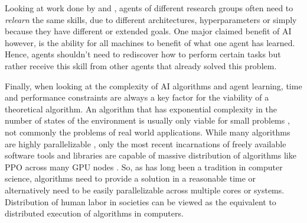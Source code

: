 \documentclass[12pt,a4paper]{article}
\begin{document}


Looking at work done by \cite{bansal2017emergent} and \cite{proximalpolicyopt}, agents of different research groups
often need to \emph{relearn} the same skills, due to different architectures, hyperparameters or simply because they
have different or extended goals. One major claimed benefit of \ac{AI} however, is the ability for all machines to
benefit of what one agent has learned. Hence, agents shouldn't need to rediscover how to perform certain tasks but
rather receive this skill from other agents that already solved this problem.

Finally, when looking at the complexity of AI algorithms and agent learning, time and performance constraints are always
a key factor for the viability of a theoretical algorithm. An algorithm that has exponential complexity in the number of
states of the environment is usually only viable for small problems \cite[p.839f.]{russell2016artificial}, not commonly
the problems of real world applications. While many algorithms are highly parallelizable
\cite{tensorflow2015-whitepaper}, only the most recent incarnations of freely available software tools and libraries are
capable of massive distribution of algorithms like \ac{PPO} across many \ac{GPU} nodes \cite{hafner2017agents}. So, as
has long been a tradition in computer science, algorithms need to provide a solution in a reasonable time or
alternatively need to be easily parallelizable across multiple cores or systems. Distribution of human labor in
societies can be viewed as the equivalent to distributed execution of algorithms in computers.
\end{document}
